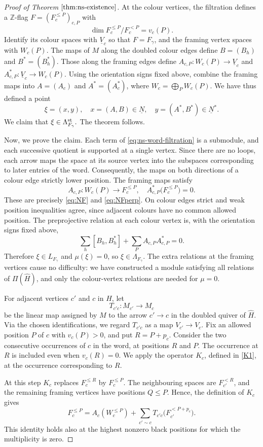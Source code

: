 \documentclass[11pt,reqno]{amsart}
\theoremstyle{definition}
\theoremstyle{remark}
\def\bbZ{\mathbb Z}
\def\dN{\underline N}
\def\dV{\underline V}
\begin{document}
\begin{proof}[Proof of Theorem $\ref{thm:ns-existence}$]
At the colour vertices, the filtration defines a $\bbZ$-flag $F=(F_c^{\leqslant P})_{c,P}$
with
\[
\dim F_c^{\leqslant P}/F_c^{<P}=v_c(P).
\]
Identify its colour spaces with $\dV_c$ so that $F=F_\gamma$,
and the framing vertex spaces with $W_c(P)$.
The maps of $M$ along the doubled colour edges define $B=(B_h)$ and $B^*=(B_h^*)$.
Those along the framing edges define
$A_{c,P}:W_c(P)\to\dV_c$ and $A^*_{c,P}:\dV_c\to W_c(P)$.
Using the orientation signs fixed above, combine the framing maps
into $A=(A_c)$ and $A^*=(A_c^*)$, where
$W_c=\bigoplus_P W_c(P)$. 
We have thus defined a point
\[
\xi=(x,y),\quad x=(A,B)\in\dN,\quad
 y=(A^*,B^*)\in\dN^*.
\]
We claim that $\xi\in\Lambda^{\rm st}_{F_\gamma}.$
The theorem follows.

Now, we prove the claim.
Each term of \eqref{eq:ns-word-filtration} is a submodule, and each
successive quotient is supported at a single vertex. Since there are
no loops, each arrow maps the space at its source vertex into the
subspaces corresponding to later entries of the word.
Consequently, the maps on both directions of a colour edge strictly
lower position. The framing maps satisfy
\[
A_{c,P}:W_c(P)\longrightarrow F_c^{\leqslant P},\quad
A^*_{c,P}\bigl(F_c^{\leqslant P}\bigr)=0.
\]
These are precisely \eqref{eq:NF} and \eqref{eq:NFperp}.
On colour edges strict and weak position inequalities agree,
since adjacent colours have no common allowed position.
The preprojective relation at each colour vertex is, with the
orientation signs fixed above,
\[
\sum_h[B_h,B_h^*]+\sum_P A_{c,P}A^*_{c,P}=0.
\]
Therefore $\xi\in L_{F_\gamma}$ and $\mu(\xi)=0$, so
$\xi\in\Lambda_{F_\gamma}$.
The extra relations at the framing vertices cause no difficulty: we have
constructed a module satisfying all relations of $\Pi(\widehat H)$,
and only the colour-vertex relations are needed for $\mu=0$.

For adjacent vertices $c'$ and $c$ in $H$, let
$$T_{c'c}:M_{c'}\to M_c$$ be the linear map assigned by $M$ to
the arrow $c'\to c$ in the doubled quiver of $\widehat H$.
Via the chosen identifications, we
regard $T_{c'c}$ as a map $V_{c'}\to V_c$.
Fix an allowed position $P$ of $c$ with $v_c(P)>0$, and put
$R=P+p_c$. Consider the two consecutive occurrences of $c$ in the word,
at positions $R$ and $P$. The occurrence at $R$ is included even when
$v_c(R)=0$. We apply the operator $K_c$, defined in \eqref{K1}, at the occurrence
corresponding to $R$.

At this step $K_c$ replaces $F_c^{\leqslant R}$ by
$F_c^{\leqslant P}$. The neighbouring spaces are $F_{c'}^{<R}$,
and the remaining framing vertices have positions $Q\leqslant P$.
Hence, the definition of $K_c$ gives
\begin{equation}\label{eq:ns-top-flag}
F_c^{\leqslant P}
=A_c(W_c^{\leqslant P})+
\sum_{c'\sim c}T_{c'c}\bigl(F_{c'}^{<P+p_c}\bigr).
\end{equation}
This identity holds also at the highest nonzero black positions for which 
the multiplicity is zero.


\end{proof}
\end{document}
